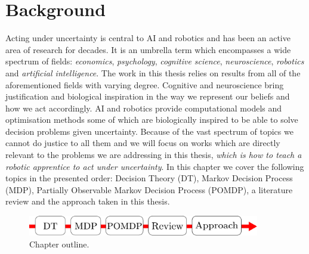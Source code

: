 \chapter{Background}

Acting under uncertainty is central to AI and robotics and has been an active area of research for decades. It
is an umbrella term which encompasses a wide spectrum of fields:  \textit{economics}, \textit{psychology}, 
\textit{cognitive science}, \textit{neuroscience}, \textit{robotics} and \textit{artificial intelligence}.
The work in this thesis relies on results from all of the aforementioned fields with varying degree.
Cognitive and neuroscience bring justification and biological inspiration in the way we represent our beliefs and how we act accordingly. 
AI and robotics provide computational models and optimisation methods some of which are biologically inspired to be able to solve decision
problems given uncertainty.
Because of the vast spectrum of topics we cannot do justice to all them and we will focus on works which are directly 
relevant to the problems we are addressing in this thesis, \textit{which is how to teach a robotic apprentice to act under uncertainty}.
In this chapter we cover the following topics in the presented order: Decision Theory (DT), Markov Decision Process (MDP), 
Partially Observable Markov Decision Process (POMDP), a literature review and the approach taken 
in this thesis.\\[0.05cm]

\begin{figure}[h]
 \centering
 \includegraphics[width=0.9\textwidth]{./ch2-Background/Figures/chap_overview.pdf}
  \caption{Chapter outline.}
  \label{fig:ch2_outline}
\end{figure}

